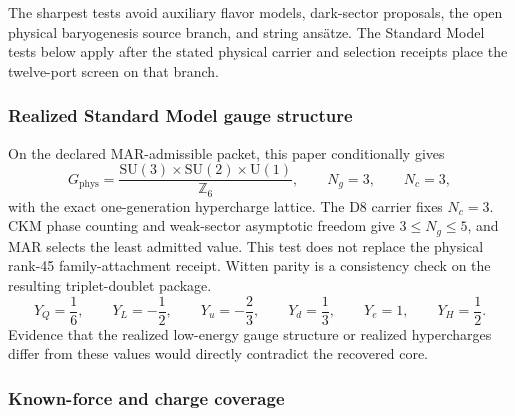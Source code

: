 \documentclass[11pt]{article}
\newcommand{\SU}{\mathrm{SU}}
\newcommand{\U}{\mathrm{U}}
\begin{document}
The sharpest tests avoid auxiliary flavor models, dark-sector proposals, the
open physical baryogenesis source branch, and string ans\"atze. The Standard
Model tests below apply after the stated physical carrier and selection
receipts place the twelve-port screen on that branch.

\subsubsection{Realized Standard Model gauge structure}

On the declared MAR-admissible packet, this paper conditionally gives
\[
G_{\mathrm{phys}}=
\frac{\SU(3)\times\SU(2)\times\U(1)}{\mathbb Z_6},
\qquad
N_g=3,
\qquad
N_c=3,
\]
with the exact one-generation hypercharge lattice. The D8 carrier fixes \(N_c=3\). CKM phase counting and weak-sector asymptotic freedom give \(3\le N_g\le5\), and MAR selects the least admitted value. This test does not replace the physical rank-45 family-attachment receipt. Witten parity is a consistency check on the resulting triplet-doublet package.
\[
Y_Q=\frac16,\qquad
Y_L=-\frac12,\qquad
Y_u=-\frac23,\qquad
Y_d=\frac13,\qquad
Y_e=1,\qquad
Y_H=\frac12.
\]
Evidence that the realized low-energy gauge structure or realized hypercharges differ from these values would directly contradict the recovered core.

\subsubsection{Known-force and charge coverage}
\end{document}
